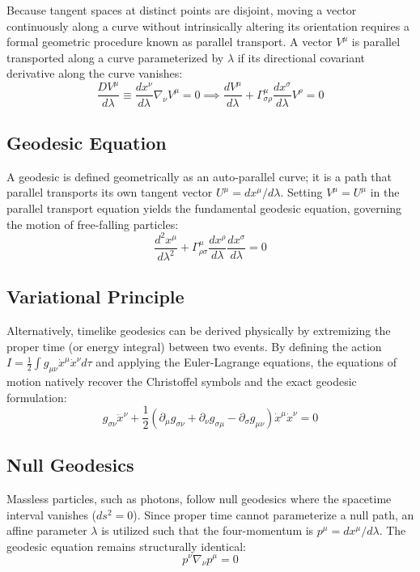 \documentclass[11pt, a4paper]{report}
\begin{document}
Because tangent spaces at distinct points are disjoint, moving a vector continuously along a curve without intrinsically altering its orientation requires a formal geometric procedure known as parallel transport. A vector $V^\mu$ is parallel transported along a curve parameterized by $\lambda$ if its directional covariant derivative along the curve vanishes:
\begin{equation}\label{eq:parallel_transport}
\frac{D V^\mu}{d\lambda} \equiv \frac{dx^\nu}{d\lambda} \nabla_\nu V^\mu = 0 \implies \frac{d V^\mu}{d\lambda} + \Gamma^\mu_{\sigma\rho} \frac{dx^\sigma}{d\lambda} V^\rho = 0
\end{equation}

\subsection*{Geodesic Equation}
A geodesic is defined geometrically as an auto-parallel curve; it is a path that parallel transports its own tangent vector $U^\mu = dx^\mu/d\lambda$. Setting $V^\mu = U^\mu$ in the parallel transport equation yields the fundamental geodesic equation, governing the motion of free-falling particles:
\begin{equation}\label{eq:geodesic_eq}
\frac{d^2 x^\mu}{d\lambda^2} + \Gamma^\mu_{\rho\sigma} \frac{dx^\rho}{d\lambda} \frac{dx^\sigma}{d\lambda} = 0
\end{equation}

\subsection*{Variational Principle}
Alternatively, timelike geodesics can be derived physically by extremizing the proper time (or energy integral) between two events. By defining the action $I = \frac{1}{2} \int g_{\mu\nu} \dot{x}^\mu \dot{x}^\nu d\tau$ and applying the Euler-Lagrange equations, the equations of motion natively recover the Christoffel symbols and the exact geodesic formulation:
\begin{equation}
g_{\sigma\nu} \ddot{x}^\nu + \frac{1}{2} \left( \partial_\mu g_{\sigma\nu} + \partial_\nu g_{\sigma\mu} - \partial_\sigma g_{\mu\nu} \right) \dot{x}^\mu \dot{x}^\nu = 0
\end{equation}

\subsection*{Null Geodesics}
Massless particles, such as photons, follow null geodesics where the spacetime interval vanishes ($ds^2 = 0$). Since proper time cannot parameterize a null path, an affine parameter $\lambda$ is utilized such that the four-momentum is $p^\mu = dx^\mu/d\lambda$. The geodesic equation remains structurally identical:
\begin{equation}
p^\nu \nabla_\nu p^\mu = 0
\end{equation}
\end{document}

